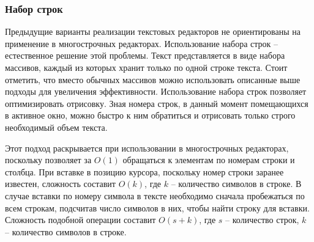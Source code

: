 \documentclass{fefu}
\begin{document}
			\subsubsection{Набор строк}
				\par Предыдущие варианты реализации текстовых редакторов не ориентированы на
				применение в многострочных редакторах. Использование набора строк --
				естественное решение этой проблемы. Текст представляется в виде набора
				массивов, каждый из которых хранит только по одной строке текста. Стоит
				отметить, что вместо обычных массивов можно использовать описанные выше
				подходы для увеличения эффективности. Использование набора строк позволяет
				оптимизировать отрисовку. Зная номера строк, в данный момент помещающихся в 
				активное окно, можно быстро к ним обратиться и отрисовать только строго
				необходимый объем текста. 
				\par Этот подход раскрывается при использовании в многострочных редакторах,
				поскольку позволяет за $O(1)$ обращаться к элементам по номерам строки и
				столбца. При вставке в позицию курсора, поскольку номер строки заранее 
				известен, сложность составит $O(k)$, где $k$ -- количество символов в строке.
				В случае вставки по номеру символа в тексте необходимо сначала пробежаться по
				всем строкам, подсчитав число символов в них, чтобы найти строку для вставки.
				Сложность подобной операции составит $O(s + k)$, где $s$ -- количество строк,
				$k$ -- количество символов в строке.
\end{document}
